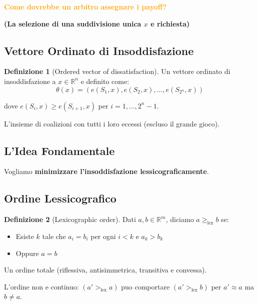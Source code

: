 \documentclass[12pt,a4paper]{article}
\theoremstyle{definition}
\newtheorem{definition}{Definizione}[section]
\begin{document}
\textcolor{orange}{\textbf{Come dovrebbe un arbitro assegnare i payoff?}}

\textbf{(La selezione di una suddivisione unica $x$ e richiesta)}

\subsection*{Vettore Ordinato di Insoddisfazione}

\begin{definition}[Ordered vector of dissatisfaction]
Un vettore ordinato di insoddisfazione a $x \in \mathbb{R}^n$ e definito come:
\[
\theta(x) = (e(S_1, x), e(S_2, x), \ldots, e(S_{2^n}, x))
\]

dove $e(S_i, x) \geq e(S_{i+1}, x)$ per $i = 1, \ldots, 2^n - 1$.
\end{definition}

L'insieme di coalizioni con tutti i loro eccessi (escluso il grande gioco).

\subsection*{L'Idea Fondamentale}

Vogliamo \textbf{minimizzare l'insoddisfazione lessicograficamente}.

\subsection*{Ordine Lessicografico}

\begin{definition}[Lexicographic order]
Dati $a, b \in \mathbb{R}^m$, diciamo $a \geq_{\text{lex}} b$ se:
\begin{itemize}
    \item Esiste $k$ tale che $a_i = b_i$ per ogni $i < k$ e $a_k > b_k$

    \item Oppure $a = b$
\end{itemize}
\end{definition}

Un ordine totale (riflessiva, antisimmetrica, transitiva e convessa).

L'ordine non e continuo: $(a' >_{\text{lex}} a)$ puo comportare $(a' >_{\text{lex}} b)$ per $a' \approx a$ ma $b \neq a$.
\end{document}
